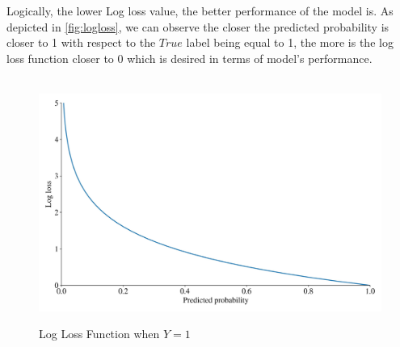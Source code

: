 Logically, the lower Log loss value, the better performance of the model is. As depicted in \autoref{fig:logloss}, we can observe the closer the predicted probability is closer to 1 with respect to the $True$ label being equal to 1, the more is the log loss function closer to 0 which is desired in terms of model's performance.
\begin{figure}[H]
    \centering
    \caption{Log Loss Function when $Y=1$}\vspace{0.5em}
    \label{fig:logloss}\
    \includegraphics[width=130mm]{Figures/logloss.jpg}
    \vspace{-1em}
\end{figure}